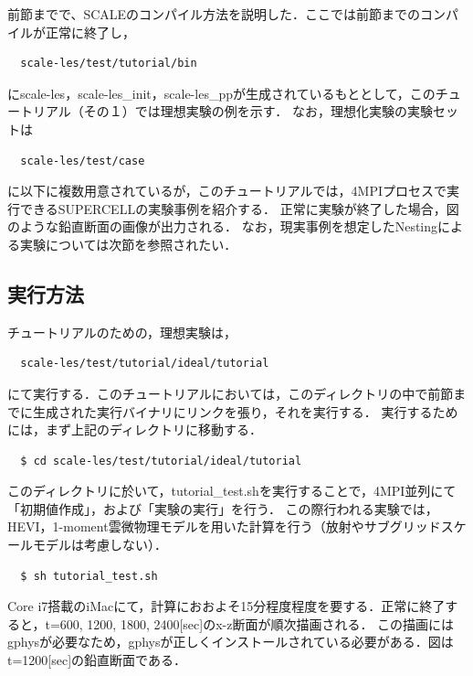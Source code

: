 
前節までで、SCALEのコンパイル方法を説明した．ここでは前節までのコンパイルが正常に終了し，

\begin{verbatim}
  scale-les/test/tutorial/bin
\end{verbatim}
にscale-les，scale-les\_init，scale-les\_ppが生成されているもととして，このチュートリアル（その１）では理想実験の例を示す．
なお，理想化実験の実験セットは

\begin{verbatim}
  scale-les/test/case
\end{verbatim}
に以下に複数用意されているが，このチュートリアルでは，4MPIプロセスで実行できるSUPERCELLの実験事例を紹介する．
正常に実験が終了した場合，図\cite{fig3.1}のような鉛直断面の画像が出力される．
なお，現実事例を想定したNestingによる実験については次節を参照されたい．

\subsection{実行方法}
チュートリアルのための，理想実験は，
\begin{verbatim}
  scale-les/test/tutorial/ideal/tutorial
\end{verbatim}
にて実行する．このチュートリアルにおいては，このディレクトリの中で前節までに生成された実行バイナリにリンクを張り，それを実行する．
実行するためには，まず上記のディレクトリに移動する．

\begin{verbatim}
  $ cd scale-les/test/tutorial/ideal/tutorial
\end{verbatim}
このディレクトリに於いて，tutorial\_test.shを実行することで，4MPI並列にて「初期値作成」，および「実験の実行」を行う．
この際行われる実験では，HEVI，1-moment雲微物理モデルを用いた計算を行う（放射やサブグリッドスケールモデルは考慮しない）．

\begin{verbatim}
  $ sh tutorial_test.sh
\end{verbatim}

Core i7搭載のiMacにて，計算におおよそ15分程度程度を要する．正常に終了すると，t=600, 1200, 1800, 2400[sec]のx-z断面が順次描画される．
この描画にはgphysが必要なため，gphysが正しくインストールされている必要がある．図\cite{fig3.1}はt=1200[sec]の鉛直断面である．

